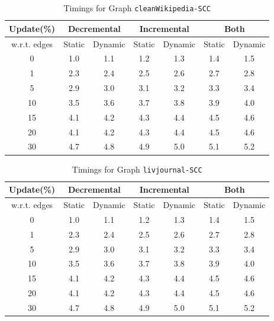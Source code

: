 \begin{table}[H]
    \centering
    \caption{Timings for Graph \texttt{cleanWikipedia-SCC} }
    \begin{tabular}{|c|c|c|c|c|c|c|}
        \hline
        \textbf{Update(\%)} & \multicolumn{2}{c|}{\textbf{Decremental}} & \multicolumn{2}{c|}{\textbf{Incremental}} & \multicolumn{2}{c|}{\textbf{Both}} \\
        \hline
        w.r.t. edges & Static &  Dynamic & Static & Dynamic & Static & Dynamic \\
        \hline
        0 & 1.0 & 1.1 & 1.2 & 1.3 & 1.4 & 1.5 \\
        1 & 2.3 & 2.4 & 2.5 & 2.6 & 2.7 & 2.8 \\
        5 & 2.9 & 3.0 & 3.1 & 3.2 & 3.3 & 3.4 \\
        10 & 3.5 & 3.6 & 3.7 & 3.8 & 3.9 & 4.0 \\
        15 & 4.1 & 4.2 & 4.3 & 4.4 & 4.5 & 4.6 \\
        20 & 4.1 & 4.2 & 4.3 & 4.4 & 4.5 & 4.6 \\
        30 & 4.7 & 4.8 & 4.9 & 5.0 & 5.1 & 5.2 \\
        \hline
    \end{tabular}
    \label{tab:timed_results_g3}
\end{table}


\begin{table}[H]
    \centering
    \caption{Timings for Graph \texttt{livjournal-SCC} }
    \begin{tabular}{|c|c|c|c|c|c|c|}
        \hline
        \textbf{Update(\%)} & \multicolumn{2}{c|}{\textbf{Decremental}} & \multicolumn{2}{c|}{\textbf{Incremental}} & \multicolumn{2}{c|}{\textbf{Both}} \\
        \hline
        w.r.t. edges & Static &  Dynamic & Static & Dynamic & Static & Dynamic \\
        \hline
        0 & 1.0 & 1.1 & 1.2 & 1.3 & 1.4 & 1.5 \\
        1 & 2.3 & 2.4 & 2.5 & 2.6 & 2.7 & 2.8 \\
        5 & 2.9 & 3.0 & 3.1 & 3.2 & 3.3 & 3.4 \\
        10 & 3.5 & 3.6 & 3.7 & 3.8 & 3.9 & 4.0 \\
        15 & 4.1 & 4.2 & 4.3 & 4.4 & 4.5 & 4.6 \\
        20 & 4.1 & 4.2 & 4.3 & 4.4 & 4.5 & 4.6 \\
        30 & 4.7 & 4.8 & 4.9 & 5.0 & 5.1 & 5.2 \\
        \hline
    \end{tabular}
    \label{tab:timed_results_g4}
\end{table}

